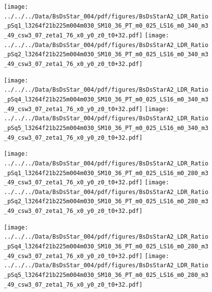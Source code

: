 \documentclass[a4paper,10pt]{article}
\begin{document}
\begin{figure}[p]
 \texttt{[image: ../../../Data/BsDsStar\_004/pdf/figures/BsDsStarA2\_LDR\_Ratio\_pSq1\_l3264f21b225m004m030\_SM10\_36\_PT\_m0\_025\_LS16\_m0\_340\_m3\_49\_csw3\_07\_zeta1\_76\_x0\_y0\_z0\_t0+32.pdf]} 
 \texttt{[image: ../../../Data/BsDsStar\_004/pdf/figures/BsDsStarA2\_LDR\_Ratio\_pSq2\_l3264f21b225m004m030\_SM10\_36\_PT\_m0\_025\_LS16\_m0\_340\_m3\_49\_csw3\_07\_zeta1\_76\_x0\_y0\_z0\_t0+32.pdf]} 
 \end{figure}
\begin{figure}[p]
 \texttt{[image: ../../../Data/BsDsStar\_004/pdf/figures/BsDsStarA2\_LDR\_Ratio\_pSq4\_l3264f21b225m004m030\_SM10\_36\_PT\_m0\_025\_LS16\_m0\_340\_m3\_49\_csw3\_07\_zeta1\_76\_x0\_y0\_z0\_t0+32.pdf]} 
 \texttt{[image: ../../../Data/BsDsStar\_004/pdf/figures/BsDsStarA2\_LDR\_Ratio\_pSq5\_l3264f21b225m004m030\_SM10\_36\_PT\_m0\_025\_LS16\_m0\_340\_m3\_49\_csw3\_07\_zeta1\_76\_x0\_y0\_z0\_t0+32.pdf]} 
 \end{figure}
\begin{figure}[p]
 \texttt{[image: ../../../Data/BsDsStar\_004/pdf/figures/BsDsStarA2\_LDR\_Ratio\_pSq1\_l3264f21b225m004m030\_SM10\_36\_PT\_m0\_025\_LS16\_m0\_280\_m3\_49\_csw3\_07\_zeta1\_76\_x0\_y0\_z0\_t0+32.pdf]} 
 \texttt{[image: ../../../Data/BsDsStar\_004/pdf/figures/BsDsStarA2\_LDR\_Ratio\_pSq2\_l3264f21b225m004m030\_SM10\_36\_PT\_m0\_025\_LS16\_m0\_280\_m3\_49\_csw3\_07\_zeta1\_76\_x0\_y0\_z0\_t0+32.pdf]} 
 \end{figure}
\clearpage
\begin{figure}[p]
 \texttt{[image: ../../../Data/BsDsStar\_004/pdf/figures/BsDsStarA2\_LDR\_Ratio\_pSq4\_l3264f21b225m004m030\_SM10\_36\_PT\_m0\_025\_LS16\_m0\_280\_m3\_49\_csw3\_07\_zeta1\_76\_x0\_y0\_z0\_t0+32.pdf]} 
 \texttt{[image: ../../../Data/BsDsStar\_004/pdf/figures/BsDsStarA2\_LDR\_Ratio\_pSq5\_l3264f21b225m004m030\_SM10\_36\_PT\_m0\_025\_LS16\_m0\_280\_m3\_49\_csw3\_07\_zeta1\_76\_x0\_y0\_z0\_t0+32.pdf]} 
 \end{figure}
\clearpage
\end{document}

